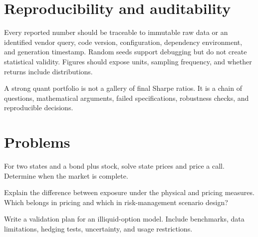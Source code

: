 \section{Reproducibility and auditability}

Every reported number should be traceable to immutable raw data or an identified
vendor query, code version, configuration, dependency environment, and generation
timestamp. Random seeds support debugging but do not create statistical validity.
Figures should expose units, sampling frequency, and whether returns include
distributions.

\begin{researchnote}
A strong quant portfolio is not a gallery of final Sharpe ratios. It is a chain of
questions, mathematical arguments, failed specifications, robustness checks, and
reproducible decisions.
\end{researchnote}

\section{Problems}

\begin{exercise}
For two states and a bond plus stock, solve state prices and price a call. Determine
when the market is complete.
\end{exercise}
\begin{exercise}
Explain the difference between exposure under the physical and pricing measures.
Which belongs in pricing and which in risk-management scenario design?
\end{exercise}
\begin{exercise}
Write a validation plan for an illiquid-option model. Include benchmarks, data
limitations, hedging tests, uncertainty, and usage restrictions.
\end{exercise}
